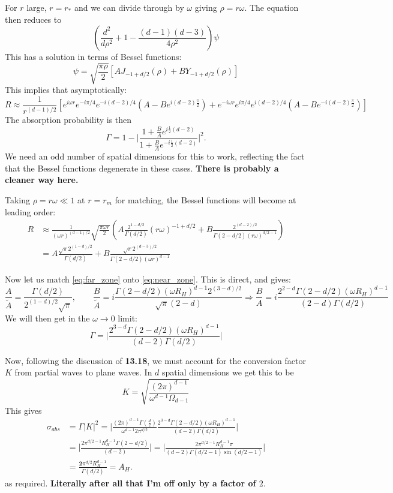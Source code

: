\documentclass[11pt, class=article, crop=false]{standalone}
\begin{document}
\begin{enumerate}
	For $r$ large, $r = r_*$ and we can divide through by $\omega$ giving $\rho = r \omega$. The equation then reduces to
	\[
		\left(\frac{d^2}{d\rho^2} + 1 - \frac{(d-1)(d-3)}{4 \rho^2} \right) \psi
	\]
	This has a solution in terms of Bessel functions:
	\[
		\psi = \sqrt{\frac{\pi \rho}{2}} [A J_{-1+d/2} (\rho) + B Y_{-1+d/2} (\rho)]
	\]
	This implies that asymptotically:
	\[
	  R \approx \frac{1}{r^{(d-1)/2}} [e^{i \omega r} e^{-i \pi/4} e^{-i (d-2)/4} (A - B e^{i (d-2)  \frac \pi2}) + e^{-i \omega r} e^{i \pi/4} e^{i (d-2)/4} (A - B e^{-i (d-2)  \frac \pi2})]
	  \]
  	The absorption probability is then
  	\[
  		\Gamma = 1 - \Bigg|\frac{1 + \frac{B}{A} e^{i \frac12 (d-2)}}{1 + \frac{B}{A} e^{-i\frac12 (d-2)}} \Bigg|^2.
  	\]
	We need an odd number of spatial dimensions for this to work, reflecting the fact that the Bessel functions degenerate in these cases. \textbf{There is probably a cleaner way here.}
	  
	Taking $\rho = r \omega \ll 1$ at $r = r_m$ for matching, the Bessel functions will become at leading order:
	\begin{equation}
		\begin{aligned}\label{eq:far_zone}
				R &\approx \frac{1}{(\omega r)^{(d-1)/2}}\sqrt{\frac{\pi \omega r}{2}} \left(A \frac{2^{1-d/2}}{\Gamma(d/2)} (r\omega)^{-1+d/2} + B \frac{2^{(d-2)/2}}{\Gamma(2-d/2) (r \omega)^{d/2-1}} \right)\\
				&=  A \frac{\sqrt{\pi} 2^{(1-d)/2}}{\Gamma(d/2)}  + B \frac{\sqrt\pi 2^{(d-3)/2}}{\Gamma(2-d/2) (\omega r)^{d-1}} 
		\end{aligned}
	\end{equation}

	Now let us match \eqref{eq:far_zone} onto \eqref{eq:near_zone}. This is direct, and gives:
	\[
		\frac{A}{\tilde A} = \frac{\Gamma(d/2)}{2^{(1-d)/2} \sqrt\pi}, \qquad  \frac{B}{\tilde A} = i \frac{\Gamma(2-d/2) (\omega R_H)^{d-1} 2^{(3-d)/2}}{\sqrt\pi (2-d) } \Rightarrow \frac{B}{A} = i \frac{2^{2-d} \Gamma(2-d/2) (\omega R_H)^{d-1} }{(2-d) \Gamma(d/2)}
	\]
	We will then get in the $\omega \to 0$ limit:
	\[
		\Gamma = \Big|\frac{2^{3-d} \Gamma(2-d/2) (\omega R_H)^{d-1}}{(d-2) \Gamma(d/2)} \Big|
	\]
	
	Now, following the discussion of \textbf{13.18}, we must account for  the conversion factor $K$ from partial waves to plane waves. In $d$ spatial dimensions we get this to be
	\[
		K = \sqrt{\frac{(2\pi)^{d-1}}{\omega^{d-1} \Omega_{d-1}}} 
	\]
	This gives
	\[
	\begin{aligned}
		\sigma_{abs} &= \Gamma |K|^2 = \Big|\frac{(2\pi)^{d-1} \Gamma(\frac d2)}{\omega^{d-1} 2 \pi^{d/2}} \frac{2^{3-d} \Gamma(2-d/2) (\omega R_H)^{d-1}}{(d-2) \Gamma(d/2)} \Big|\\
		 &= \Big|\frac{2 \pi^{d/2-1} R_H^{d-1} \Gamma(2-d/2)}{(d-2)} \Big| = \Big|\frac{2 \pi^{d/2-1} R_H^{d-1} \pi}{(d-2) \Gamma(d/2 - 1) \sin(d/2-1)} \Big|\\
		 &= \frac{\mathbf{2} \pi^{d/2} R_H^{d-1}}{\Gamma(d/2)} = A_H.
	\end{aligned}
	\]
	as required. \textbf{Literally after all that I'm off only by a factor of $2$}.
	


\end{enumerate}
\end{document}

